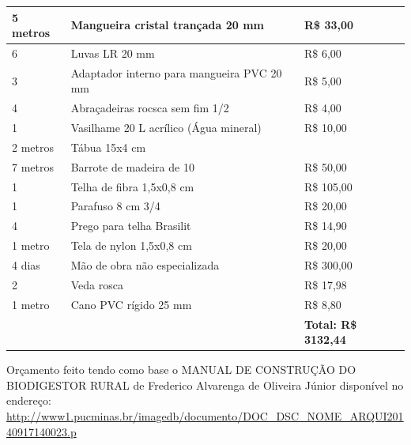 \begin{table}[]
\begin{tabular}{|l|l|l|}
5 metros & Mangueira cristal trançada 20 mm & R\$ 33,00 \\ \hline
6 & Luvas LR 20 mm & R\$ 6,00 \\ \hline
3 & Adaptador interno para mangueira PVC 20 mm & R\$ 5,00 \\ \hline
4 & Abraçadeiras rocsca sem fim 1/2 & R\$ 4,00 \\ \hline
1 & Vasilhame 20 L acrílico (Água mineral) & R\$ 10,00 \\ \hline
2 metros & Tábua 15x4 cm &  \\ \hline
7 metros & Barrote de madeira de 10 & R\$ 50,00 \\ \hline
1 & Telha de fibra 1,5x0,8 cm & R\$ 105,00 \\ \hline
1 & Parafuso 8 cm 3/4 & R\$ 20,00 \\ \hline
4 & Prego para telha Brasilit & R\$ 14,90 \\ \hline
1 metro & Tela de nylon 1,5x0,8 cm & R\$ 20,00 \\ \hline
4 dias & Mão de obra não especializada & R\$ 300,00 \\ \hline
2 & Veda rosca & R\$ 17,98 \\ \hline
1 metro & Cano PVC rígido 25 mm & R\$ 8,80 \\ \hline
 &  & \textbf{Total: R\$ 3132,44} \\ \hline
\end{tabular}
\end{table}

Orçamento feito tendo como base o MANUAL DE CONSTRUÇÃO DO BIODIGESTOR RURAL de Frederico Alvarenga de Oliveira Júnior disponível no endereço: \url{http://www1.pucminas.br/imagedb/documento/DOC_DSC_NOME_ARQUI20140917140023.p}
